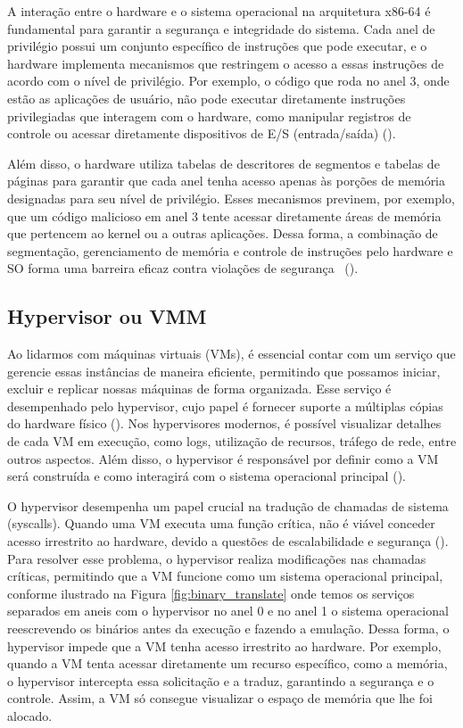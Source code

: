 A interação entre o hardware e o sistema operacional na arquitetura x86-64 é fundamental para garantir a segurança e integridade do sistema. Cada anel de privilégio possui um conjunto específico de instruções que pode executar, e o hardware implementa mecanismos que restringem o acesso a essas instruções de acordo com o nível de privilégio. Por exemplo, o código que roda no anel 3, onde estão as aplicações de usuário, não pode executar diretamente instruções privilegiadas que interagem com o hardware, como manipular registros de controle ou acessar diretamente dispositivos de E/S (entrada/saída) (\cite{chirammal2016mastering}). 

Além disso, o hardware utiliza tabelas de descritores de segmentos e tabelas de páginas para garantir que cada anel tenha acesso apenas às porções de memória designadas para seu nível de privilégio. Esses mecanismos previnem, por exemplo, que um código malicioso em anel 3 tente acessar diretamente áreas de memória que pertencem ao kernel ou a outras aplicações. Dessa forma, a combinação de segmentação, gerenciamento de memória e controle de instruções pelo hardware e SO forma uma barreira eficaz contra violações de segurança ~(\cite{chirammal2016mastering}).



\subsection{Hypervisor ou VMM}

Ao lidarmos com máquinas virtuais (VMs), é essencial contar com um serviço que gerencie essas instâncias de maneira eficiente, permitindo que possamos iniciar, excluir e replicar nossas máquinas de forma organizada. Esse serviço é desempenhado pelo hypervisor, cujo papel é fornecer suporte a múltiplas cópias do hardware físico (\cite{modernOS}). Nos hypervisores modernos, é possível visualizar detalhes de cada VM em execução, como logs, utilização de recursos, tráfego de rede, entre outros aspectos. Além disso, o hypervisor é responsável por definir como a VM será construída e como interagirá com o sistema operacional principal (\cite{chirammal2016mastering}).

O hypervisor desempenha um papel crucial na tradução de chamadas de sistema (syscalls). Quando uma VM executa uma função crítica, não é viável conceder acesso irrestrito ao hardware, devido a questões de escalabilidade e segurança (\cite{modernOS}). Para resolver esse problema, o hypervisor realiza modificações nas chamadas críticas, permitindo que a VM funcione como um sistema operacional principal, conforme ilustrado na Figura \ref{fig:binary_translate} onde temos os serviços separados em aneis com o hypervisor no anel 0 e no anel 1 o sistema operacional reescrevendo os binários antes da execução e fazendo a emulação. Dessa forma, o hypervisor impede que a VM tenha acesso irrestrito ao hardware. Por exemplo, quando a VM tenta acessar diretamente um recurso específico, como a memória, o hypervisor intercepta essa solicitação e a traduz, garantindo a segurança e o controle. Assim, a VM só consegue visualizar o espaço de memória que lhe foi alocado.

